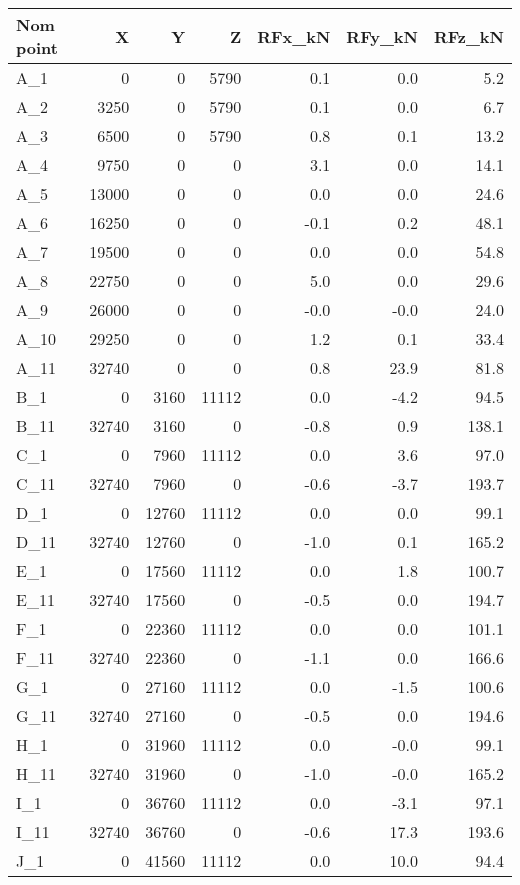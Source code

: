 \begin{tabular}{lrrrrrr}
\toprule
Nom point & X & Y & Z & RFx\_kN & RFy\_kN & RFz\_kN \\
\midrule
A\_1 & 0 & 0 & 5790 & 0.1 & 0.0 & 5.2 \\
A\_2 & 3250 & 0 & 5790 & 0.1 & 0.0 & 6.7 \\
A\_3 & 6500 & 0 & 5790 & 0.8 & 0.1 & 13.2 \\
A\_4 & 9750 & 0 & 0 & 3.1 & 0.0 & 14.1 \\
A\_5 & 13000 & 0 & 0 & 0.0 & 0.0 & 24.6 \\
A\_6 & 16250 & 0 & 0 & -0.1 & 0.2 & 48.1 \\
A\_7 & 19500 & 0 & 0 & 0.0 & 0.0 & 54.8 \\
A\_8 & 22750 & 0 & 0 & 5.0 & 0.0 & 29.6 \\
A\_9 & 26000 & 0 & 0 & -0.0 & -0.0 & 24.0 \\
A\_10 & 29250 & 0 & 0 & 1.2 & 0.1 & 33.4 \\
A\_11 & 32740 & 0 & 0 & 0.8 & 23.9 & 81.8 \\
B\_1 & 0 & 3160 & 11112 & 0.0 & -4.2 & 94.5 \\
B\_11 & 32740 & 3160 & 0 & -0.8 & 0.9 & 138.1 \\
C\_1 & 0 & 7960 & 11112 & 0.0 & 3.6 & 97.0 \\
C\_11 & 32740 & 7960 & 0 & -0.6 & -3.7 & 193.7 \\
D\_1 & 0 & 12760 & 11112 & 0.0 & 0.0 & 99.1 \\
D\_11 & 32740 & 12760 & 0 & -1.0 & 0.1 & 165.2 \\
E\_1 & 0 & 17560 & 11112 & 0.0 & 1.8 & 100.7 \\
E\_11 & 32740 & 17560 & 0 & -0.5 & 0.0 & 194.7 \\
F\_1 & 0 & 22360 & 11112 & 0.0 & 0.0 & 101.1 \\
F\_11 & 32740 & 22360 & 0 & -1.1 & 0.0 & 166.6 \\
G\_1 & 0 & 27160 & 11112 & 0.0 & -1.5 & 100.6 \\
G\_11 & 32740 & 27160 & 0 & -0.5 & 0.0 & 194.6 \\
H\_1 & 0 & 31960 & 11112 & 0.0 & -0.0 & 99.1 \\
H\_11 & 32740 & 31960 & 0 & -1.0 & -0.0 & 165.2 \\
I\_1 & 0 & 36760 & 11112 & 0.0 & -3.1 & 97.1 \\
I\_11 & 32740 & 36760 & 0 & -0.6 & 17.3 & 193.6 \\
J\_1 & 0 & 41560 & 11112 & 0.0 & 10.0 & 94.4 \\

\end{tabular}
